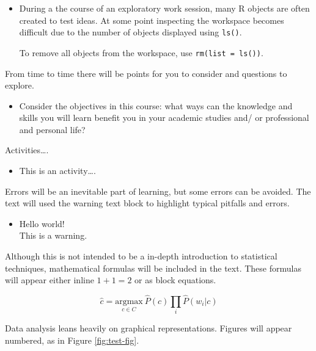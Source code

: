 \documentclass[
]{article}
\newenvironment{rmdblock}[1]
  {\begin{shaded*}
  \begin{itemize}
  \renewcommand{\labelitemi}{
    \raisebox{-.5\height}[0pt][0pt]{
      {\setkeys{Gin}{width=2em,keepaspectratio}\texttt{[image: assets/images/\#1]}}
    }
  }
  \item
  }
  {
  \end{itemize}
  \end{shaded*}
  }
\newenvironment{rmdtip}
  {\begin{rmdblock}{tip}}
  {\end{rmdblock}}
\newenvironment{rmdwarning}
  {\begin{rmdblock}{warning}}
  {\end{rmdblock}}
\newenvironment{rmdactivity}
  {\begin{rmdblock}{code}}
  {\end{rmdblock}}
\newenvironment{rmdquestion}
  {\begin{rmdblock}{question}}
  {\end{rmdblock}}
\begin{document}
\begin{rmdtip}
During a the course of an exploratory work session, many R objects are
often created to test ideas. At some point inspecting the workspace
becomes difficult due to the number of objects displayed using
\texttt{ls()}.

To remove all objects from the workspace, use
\texttt{rm(list\ =\ ls())}.
\end{rmdtip}

From time to time there will be points for you to consider and questions to explore.

\begin{rmdquestion}
Consider the objectives in this course: what ways can the knowledge and
skills you will learn benefit you in your academic studies and/ or
professional and personal life?
\end{rmdquestion}

Activities\ldots.

\begin{rmdactivity}
This is an activity\ldots.
\end{rmdactivity}

Errors will be an inevitable part of learning, but some errors can be avoided. The text will used the warning text block to highlight typical pitfalls and errors.

\begin{rmdwarning}
Hello world!\\
This is a warning.
\end{rmdwarning}

Although this is not intended to be a in-depth introduction to statistical techniques, mathematical formulas will be included in the text. These formulas will appear either inline \(1 + 1 = 2\) or as block equations.

\begin{equation}
  \hat{c} = \underset{c \in C} {\mathrm{argmax}} ~\hat{P}(c) \prod_i \hat{P}(w_i|c)
  \label{eq:example-formula}
\end{equation}

Data analysis leans heavily on graphical representations. Figures will appear numbered, as in Figure \ref{fig:test-fig}.
\end{document}

